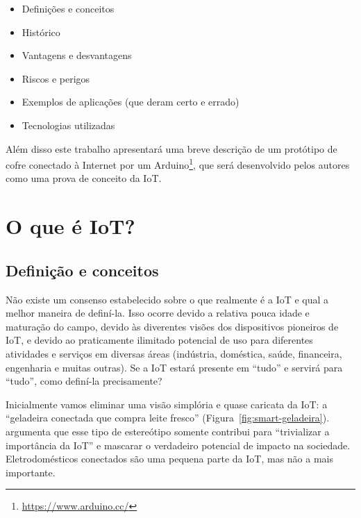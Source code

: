 \documentclass[pdftex, brazil, 12pt, twoside]{article}
\begin{document}
\begin{itemize}[noitemsep]
\item Definições e conceitos
\item Histórico
\item Vantagens e desvantagens
\item Riscos e perigos
\item Exemplos de aplicações (que deram certo e errado)
\item Tecnologias utilizadas
\end{itemize}

Além disso este trabalho apresentará uma breve descrição de um protótipo de
cofre conectado à Internet por um Arduino\footnote{\url{https://www.arduino.cc/}},
que será desenvolvido pelos autores como uma prova de conceito da IoT.


\section{O que é IoT?}
\label{o-que-e-iot}


\subsection{Definição e conceitos}
\label{o-que-e-iot-definicao}

Não existe um consenso estabelecido sobre o que realmente é a IoT e qual a melhor
maneira de definí-la. Isso ocorre devido a relativa pouca idade e maturação do
campo, devido às diverentes visões dos dispositivos pioneiros de IoT, e devido
ao praticamente ilimitado potencial de uso para diferentes atividades e serviços
em diversas áreas (indústria, doméstica, saúde, financeira, engenharia e muitas
outras). Se a IoT estará presente em ``tudo'' e servirá para ``tudo'', como
definí-la precisamente?

Inicialmente vamos eliminar uma visão simplória e quase caricata da IoT: a
``geladeira conectada que compra leite fresco'' (Figura~\ref{fig:smart-geladeira}).
\citet{UKGOSWalportIoT2014}
argumenta que esse tipo de estereótipo somente contribui para ``trivializar
a importância da IoT'' e mascarar o verdadeiro potencial de impacto na sociedade.
Eletrodomésticos conectados são uma pequena parte da IoT, mas não a mais
importante.
\end{document}
